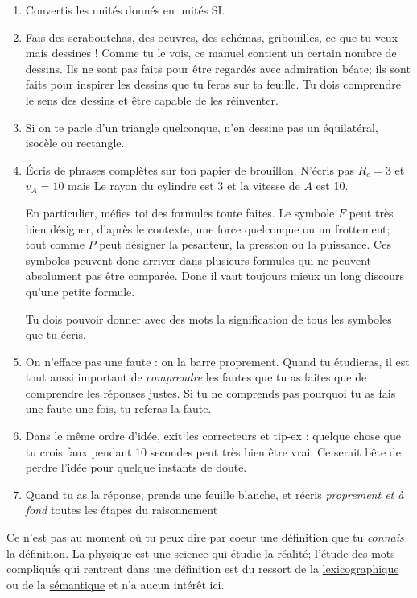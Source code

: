 \begin{enumerate}
\item Convertis les unités donnés en unités SI. 
\item Fais des scraboutchas, des oeuvres, des schémas, gribouilles, ce que tu veux mais dessines !
    Comme tu le vois, ce manuel contient un certain nombre de dessins. Ils ne sont pas faits pour être regardés avec admiration béate; ils sont faits pour inspirer les dessins que tu feras sur ta feuille. Tu dois comprendre le sens des dessins et être capable de les réinventer.
\item Si on te parle d'un triangle quelconque, n'en dessine pas un équilatéral, isocèle ou rectangle.
\item Écris de phrases complètes sur ton papier de brouillon. N'écris pas \og $R_c=3$ et $v_A=10$ \fg{} mais \og Le rayon du cylindre est \unit{3}{\meter} et la vitesse de $A$ est \unit{10}{\meter\per\second}\fg.


En particulier, méfies toi des \og formules\fg{} toute faites. Le symbole $F$ peut très bien désigner,  d'après le contexte,  une force quelconque ou un frottement; tout comme $P$ peut désigner la pesanteur, la pression ou la puissance. Ces symboles peuvent donc arriver dans plusieurs formules qui ne peuvent absolument pas être comparée. Donc il vaut toujours mieux un long discours qu'une petite formule. 

Tu dois pouvoir donner avec des mots la signification de tous les symboles que tu écris.


\item On n'efface pas une faute : on la barre proprement. Quand tu étudieras, il est tout aussi important de \emph{comprendre} les fautes que tu as faites que de comprendre les réponses justes. Si tu ne comprends pas pourquoi tu as fais une faute une fois, tu referas la faute.
\item Dans le même ordre d'idée, exit les correcteurs et tip-ex : quelque chose que tu crois faux pendant 10 secondes peut très bien être vrai. Ce serait bête de perdre l'idée pour quelque instants de doute.
\item Quand tu as la réponse, prends une feuille blanche, et récris \emph{proprement et à fond} toutes les étapes du raisonnement
\end{enumerate}

Ce n'est pas au moment où tu peux dire par coeur une définition que tu  \emph{connais} la définition. La physique est une science qui étudie la réalité; l'étude des mots compliqués qui rentrent dans une définition est du ressort de la \href{http://fr.wikipedia.org/wiki/Lexicologie}{lexicographique} ou de la \href{http://fr.wikipedia.org/wiki/Sémantique}{sémantique} et n'a aucun intérêt ici.


